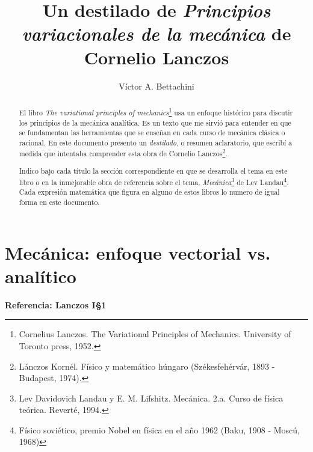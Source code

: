 \documentclass[12pt, spanish, a4paper, ]{article}
\title{Un destilado de \emph{Principios variacionales de la mecánica} de Cornelio Lanczos}
\author{Víctor A. Bettachini}
\date{}
\begin{document}
\maketitle
%

\begin{abstract}
	El libro \emph{The variational principles of mechanics}\footnote{Cornelius Lanczos. The Variational Principles of Mechanics. University of Toronto press, 1952.
} usa un enfoque histórico para discutir los principios de la mecánica analítica.
	Es un texto que me sirvió para entender en que se fundamentan las herramientas que se enseñan en cada curso de mecánica clásica o racional.
	En este documento presento un \emph{destilado}, o resumen aclaratorio, que escribí a medida que intentaba comprender esta obra de Cornelio Lanczos\footnote{Lánczos Kornél. Físico y matemático húngaro (Székesfehérvár, 1893 - Budapest, 1974).}.

	Indico bajo cada título la sección correspondiente en que se desarrolla el tema en este libro o en la inmejorable obra de referencia sobre el tema, \emph{Mecánica}\footnote{Lev Davidovich Landau y E. M. Lifshitz. Mecánica. 2.a. Curso de física teórica. Reverté, 1994.
} de Lev Landau\footnote{Físico soviético, premio Nobel en física en el año 1962 (Baku, 1908 - Moscú, 1968)}. 
	Cada expresión matemática que figura en alguno de estos libros lo numero de igual forma en este documento.
\end{abstract}


\tableofcontents


\section{Mecánica: enfoque vectorial vs. analítico}
\textbf{Referencia: Lanczos I\S1}\\
\end{document}
